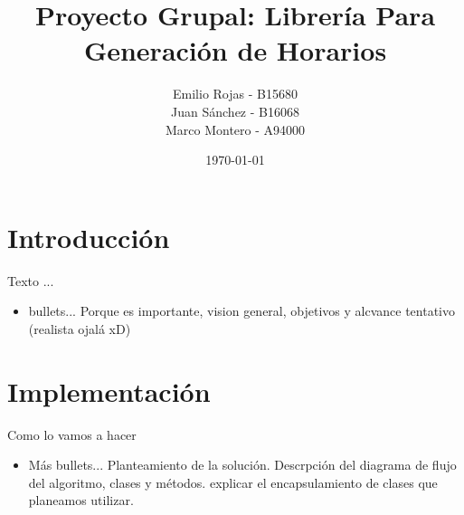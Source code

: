 \documentclass[10pt]{beamer}
\title{Proyecto Grupal: Librería Para Generación de Horarios}
\subtitle{}  %
\date{\today}
\author{
Emilio Rojas - B15680\\
  Juan Sánchez - B16068\\
  Marco Montero - A94000\\
  \href{mailto:}{{\tt}}
}
\institute[
  IE0217 - Estructuras de datos abstractas y algoritmos\\
  Escuela de Ingenieria Eléctrica\\
  Universidad de Costa Rica
] %
{%
  IE0217 - Estructuras de datos abstractas y algoritmos\\\
  Escuela de Ingenieria Eléctrica\\
  Universidad de Costa Rica
  
}
\begin{document}
\aauwavesbg

\begin{frame} %
\titlepage
\end{frame}


%









\section{Introducción}

\begin{frame}{Texto ...}{}
\begin{block}{}
  \begin{itemize}
  \item bullets... Porque es importante, vision general, objetivos y alcvance tentativo (realista ojalá xD)
  \end{itemize}


\end{block}
\end{frame}




\section{Implementación}
\begin{frame}{Como lo vamos a hacer}{}
\begin{block}{}

\begin{itemize}
\item Más bullets... Planteamiento de la solución. Descrpción del diagrama de flujo del algoritmo, clases y métodos. explicar el encapsulamiento de clases que planeamos utilizar.
\end{itemize}
  
\end{block}
\end{frame}
\end{document}
